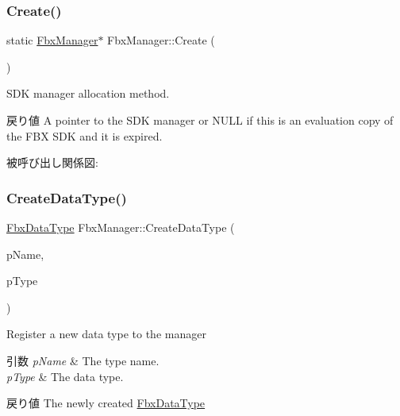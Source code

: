 \subsubsection{\texorpdfstring{Create()}{Create()}}
{\footnotesize\ttfamily static \hyperlink{class_fbx_manager}{Fbx\+Manager}$\ast$ Fbx\+Manager\+::\+Create (\begin{DoxyParamCaption}{ }\end{DoxyParamCaption})\hspace{0.3cm}{\ttfamily [static]}}

S\+DK manager allocation method. \begin{DoxyReturn}{戻り値}
A pointer to the S\+DK manager or {\ttfamily N\+U\+LL} if this is an evaluation copy of the F\+BX S\+DK and it is expired. 
\end{DoxyReturn}
被呼び出し関係図\+:
\mbox{\label{class_fbx_manager_a832d8b98c57a7781bc736bb49c131bb6}} 
\subsubsection{\texorpdfstring{Create\+Data\+Type()}{CreateDataType()}}
{\footnotesize\ttfamily \hyperlink{class_fbx_data_type}{Fbx\+Data\+Type} Fbx\+Manager\+::\+Create\+Data\+Type (\begin{DoxyParamCaption}\item[{const char $\ast$}]{p\+Name,  }\item[{const \hyperlink{fbxpropertytypes_8h_a73913a5ddfb20e57c6f25e9e6784bd92}{E\+Fbx\+Type}}]{p\+Type }\end{DoxyParamCaption})}

Register a new data type to the manager 
\begin{DoxyParams}{引数}
{\em p\+Name} & The type name. \\
\hline
{\em p\+Type} & The data type. \\
\hline
\end{DoxyParams}
\begin{DoxyReturn}{戻り値}
The newly created \hyperlink{class_fbx_data_type}{Fbx\+Data\+Type} 
\end{DoxyReturn}
\mbox{\label{class_fbx_manager_a835e4e738e31eafa937b6fbd4b548804}} 
